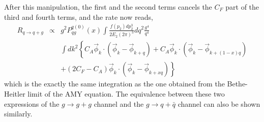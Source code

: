 After this manipulation, the first and the second terms cancels the $C_F$ part of the third and fourth terms, and the rate now reads,
\begin{eqnarray}
R_{q\rightarrow q+g} &\propto& g^2 P_{qg}^{q(0)}(x) \int  \frac{f(p_2)dp_2^3}{2E_2(2\pi)^3} d q^2 \frac{g^4}{q^4}\\\nonumber
&&  \int d k^2\left\{
C_A\vec{\phi}_{k}\cdot \left( \vec{\phi}_{k}-\vec{\phi}_{k+q} \right)
+C_A\vec{\phi}_{k} \cdot \left( \vec{\phi}_k - \vec{\phi}_{k+(1-x)q}\right) \right.\\\nonumber
&&\left.+(2C_F-C_A)\vec{\phi}_{k} \cdot \left(\vec{\phi}_k-\vec{\phi}_{k+xq} \right)
\right\}
\end{eqnarray}
which is the exactly the same integration as the one obtained from the Bethe-Heitler limit of the AMY equation.
The equivalence between these two expressions of the $g\rightarrow g+g$ channel and the $g\rightarrow q+\bar{q}$ channel can also be shown similarly.


